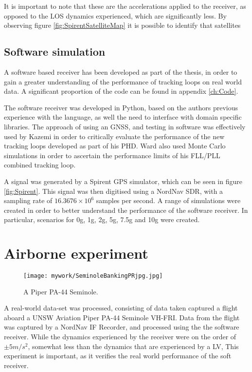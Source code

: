 It is important to note that these are the accelerations applied to the receiver, as opposed to the \ac{LOS} dynamics experienced, which are significantly less. By observing figure \ref{fig:SpirentSatelliteMap} it is possible to identify that satellites 


\subsection{Software simulation}

A software based receiver has been developed as part of the thesis, in order to gain a greater understanding of the performance of tracking loops on real world data. A significant proportion of the code can be found in appendix \ref{ch:Code}.

The software receiver was developed in Python, based on the authors previous experience with the language, as well the need to interface with domain specific libraries.  The approach of using an \ac{GNSS}, and testing in software was effectively used by Kazemi \cite{KazemiPHD} in order to critically evaluate the performance of the new tracking loops developed as part of his PHD. Ward also used Monte Carlo simulations in order to ascertain the performance limits of his FLL/PLL combined tracking loop.

A signal was generated by a Spirent \ac{GPS} simulator, which can be seen in figure \ref{fig:Spirent}. This signal was then digitised using a NordNav \ac{SDR}, with a sampling rate of $16.3676 \times 10^6$ samples per second. A range of simulations were created in order to better understand the performance of the software receiver. In particular, scenarios for 0g, 1g, 2g, 5g, 7.5g and 10g were created.


\section{Airborne experiment}

\begin{figure}[!htb] 
    \centering
    \texttt{[image: mywork/SeminoleBankingPRjpg.jpg]} 
    \caption{A Piper PA-44 Seminole.}
    \label{fig:PiperSeminole}
\end{figure}

A real-world data-set was processed, consisting of data taken captured a flight aboard a UNSW Aviation Piper PA-44 Seminole VH-FRI. Data from the flight was captured by a NordNav IF Recorder, and processed using the the software receiver. While the dynamics experienced by the receiver were on the order of $\pm 5m/s^2$, somewhat less than the dynamics that are experienced by a \ac{LV}, This experiment is important, as it verifies the real world performance of the soft receiver. 


